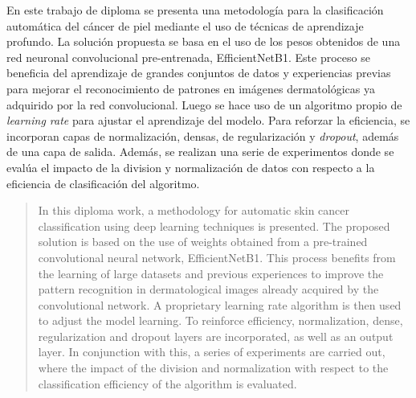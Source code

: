 \begin{resumen}		
	En este trabajo de diploma se presenta una metodología para la clasificación automática del cáncer de piel mediante el uso de técnicas de aprendizaje profundo. La solución propuesta se basa en el uso de los pesos obtenidos de una red neuronal convolucional pre-entrenada, EfficientNetB1. Este proceso se beneficia del aprendizaje de grandes conjuntos de datos y experiencias previas para mejorar el reconocimiento de patrones en imágenes dermatológicas ya adquirido por la red convolucional. Luego se hace uso de un algoritmo propio de \textit{learning rate} para ajustar el aprendizaje del modelo. Para reforzar la eficiencia, se incorporan capas de normalización, densas, de regularización y \textit{dropout}, además de una capa de salida. Además, se realizan una serie de experimentos donde se evalúa el impacto de la division y normalización de datos con respecto a la eficiencia de clasificación del algoritmo.

\end{resumen}

\begin{abstract}	
	In this diploma work, a methodology for automatic skin cancer classification using deep learning techniques is presented. The proposed solution is based on the use of weights obtained from a pre-trained convolutional neural network, EfficientNetB1. This process benefits from the learning of large datasets and previous experiences to improve the pattern recognition in dermatological images already acquired by the convolutional network. A proprietary learning rate algorithm is then used to adjust the model learning.	To reinforce efficiency, normalization, dense, regularization and dropout layers are incorporated, as well as an output layer. In conjunction with this, a series of experiments are carried out, where the impact of the division and normalization with respect to the classification efficiency of the algorithm is evaluated.
\end{abstract}